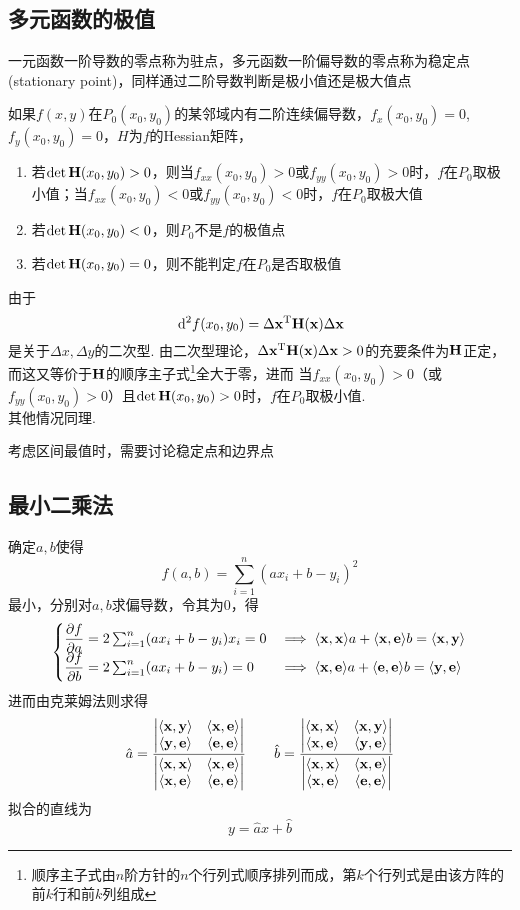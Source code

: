 
\subsection{多元函数的极值}
一元函数一阶导数的零点称为驻点，多元函数一阶偏导数的零点称为稳定点(stationary point)，同样通过二阶导数判断是极小值还是极大值点
\begin{theorem}
如果$f(x,y)$在$P_0(x_0,y_0)$的某邻域内有二阶连续偏导数，$f_x(x_0,y_0)=0$, $f_y(x_0,y_0)=0$，$H$为$f$的Hessian矩阵，
\begin{enumerate}
	\item 若$\det \mathbf{H}(x_0,y_0)>0$，则当$f_{xx}(x_0,y_0)>0$或$f_{yy}(x_0,y_0)>0$时，$f$在$P_0$取极小值；当$f_{xx}(x_0,y_0)<0$或$f_{yy}(x_0,y_0)<0$时，$f$在$P_0$取极大值
	\item 若$\det \mathbf{H}(x_0,y_0)<0$，则$P_0$不是$f$的极值点
	\item 若$\det \mathbf{H}(x_0,y_0)=0$，则不能判定$f$在$P_0$是否取极值
\end{enumerate}
\end{theorem}
\begin{analysis}
由于
\[\,\mathrm{d}^2 f(x_0,y_0)=\Delta\mathbf{x}^{\mathrm{T}}\mathbf{H}(\mathbf{x})\Delta\mathbf{x}\]
是关于$\Delta x,\Delta y$的二次型.
由二次型理论，$\Delta\mathbf{x}^{\mathrm{T}}\mathbf{H}(\mathbf{x})\Delta\mathbf{x}>0$的充要条件为$\mathbf{H}$正定，而这又等价于$\mathbf{H}$的顺序主子式\footnote{顺序主子式由$n$阶方针的$n$个行列式顺序排列而成，第$k$个行列式是由该方阵的前$k$行和前$k$列组成}全大于零，进而
当$f_{xx}(x_0,y_0)>0$（或$f_{yy}(x_0,y_0)>0$）且$\det \mathbf{H}(x_0,y_0)>0$时，$f$在$P_0$取极小值.\\
其他情况同理.
\end{analysis}
考虑区间最值时，需要讨论稳定点和边界点

\subsection{最小二乘法}
确定$a,b$使得
\[f(a,b)=\sum_{i=1}^n(ax_i+b-y_i)^2\]
最小，分别对$a,b$求偏导数，令其为$0$，得
\[\begin{cases}
\dfrac{\partial f}{\partial a}=2\sum_{i=1}^n(ax_i+b-y_i)x_i=0 & \implies\langle \mathbf{x},\mathbf{x} \rangle a+\langle \mathbf{x},\mathbf{e} \rangle b=\langle \mathbf{x},\mathbf{y} \rangle\\
\dfrac{\partial f}{\partial b}=2\sum_{i=1}^n(ax_i+b-y_i)=0 & \implies\langle \mathbf{x},\mathbf{e} \rangle a+\langle \mathbf{e},\mathbf{e} \rangle b=\langle \mathbf{y},\mathbf{e} \rangle
\end{cases}\]
进而由克莱姆法则求得
\[\hat{a}=\frac{\begin{vmatrix}\langle \mathbf{x},\mathbf{y} \rangle & \langle \mathbf{x},\mathbf{e} \rangle\\\langle \mathbf{y},\mathbf{e} \rangle&\langle \mathbf{e},\mathbf{e} \rangle\end{vmatrix}}
{\begin{vmatrix}\langle \mathbf{x},\mathbf{x} \rangle & \langle \mathbf{x},\mathbf{e} \rangle\\\langle \mathbf{x},\mathbf{e} \rangle&\langle \mathbf{e},\mathbf{e} \rangle\end{vmatrix}}
\qquad
\hat{b}=\frac{\begin{vmatrix}\langle \mathbf{x},\mathbf{x} \rangle & \langle \mathbf{x},\mathbf{y} \rangle\\\langle \mathbf{x},\mathbf{e} \rangle&\langle \mathbf{y},\mathbf{e} \rangle\end{vmatrix}}
{\begin{vmatrix}\langle \mathbf{x},\mathbf{x} \rangle & \langle \mathbf{x},\mathbf{e} \rangle\\\langle \mathbf{x},\mathbf{e} \rangle&\langle \mathbf{e},\mathbf{e} \rangle\end{vmatrix}}\]
拟合的直线为
\[y=\hat{a}x+\hat{b}\]

